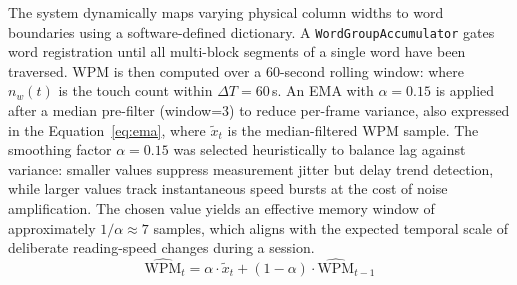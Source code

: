 \documentclass[conference]{IEEEtran}
\begin{document}
    The system dynamically maps varying physical column widths to word boundaries using a software-defined dictionary. A \texttt{WordGroupAccumulator} gates word registration until all multi-block segments of a single word have been traversed. WPM is then computed
    over a 60-second rolling window:
    where $n_w(t)$ is the touch count within $\Delta T = 60$\,s. An EMA
    with $\alpha = 0.15$ is applied after a median pre-filter (window=3)
    to reduce per-frame variance, also expressed in the Equation~\ref{eq:ema},
    where $\tilde{x}_t$ is the median-filtered WPM sample. The smoothing
    factor $\alpha = 0.15$ was selected heuristically to balance lag
    against variance: smaller values suppress measurement jitter but
    delay trend detection, while larger values track instantaneous speed
    bursts at the cost of noise amplification. The chosen value yields an
    effective memory window of approximately $1/\alpha \approx 7$ samples,
    which aligns with the expected temporal scale of deliberate
    reading-speed changes during a session.
    \vspace{-4mm}
    \begin{equation}
        \widehat{\text{WPM}}_t = \alpha \cdot \tilde{x}_t
        + (1-\alpha)\cdot\widehat{\text{WPM}}_{t-1}
        \label{eq:ema}
    \end{equation}
      \vspace{-6mm}

\end{document}
